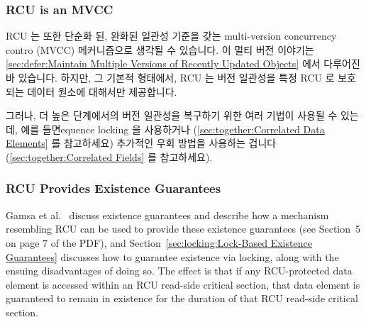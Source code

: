 \fi

\subsubsection{RCU is an MVCC}
\label{sec:defer:RCU is an MVCC}

RCU 는 또한 단순화 된, 완화된 일관성 기준을 갖는 multi-version concurrency
contro (MVCC) 메커니즘으로 생각될 수 있습니다.
이 멀티 버전 이야기는
\cref{sec:defer:Maintain Multiple Versions of Recently Updated Objects}
에서 다루어진 바 있습니다.
하지만, 그 기본적 형태에서, RCU 는 버전 일관성을 특정 RCU 로 보호되는 데이터
원소에 대해서만 제공합니다.

그러나, 더 높은 단계에서의 버전 일관성을 복구하기 위한 여러 기법이 사용될 수
있는데, 예를 들면equence locking 을 사용하거나
(\cref{sec:together:Correlated Data Elements} 를 참고하세요)
추가적인 우회 방법을 사용하는 겁니다
(\cref{sec:together:Correlated Fields} 를 참고하세요).

\subsubsection{RCU Provides Existence Guarantees}
\label{sec:defer:RCU Provides Existence Guarantees}

Gamsa et al.~\cite{Gamsa99}
discuss existence guarantees and describe how a mechanism
resembling RCU can be used to provide these existence guarantees
(see Section~5 on page 7 of the PDF), and
Section~\ref{sec:locking:Lock-Based Existence Guarantees}
discusses how to guarantee existence via locking, along with the
ensuing disadvantages of doing so.
The effect is that if any RCU-protected data element is accessed
within an RCU read-side critical section, that data element is
guaranteed to remain in existence for the duration of that RCU
read-side critical section.

